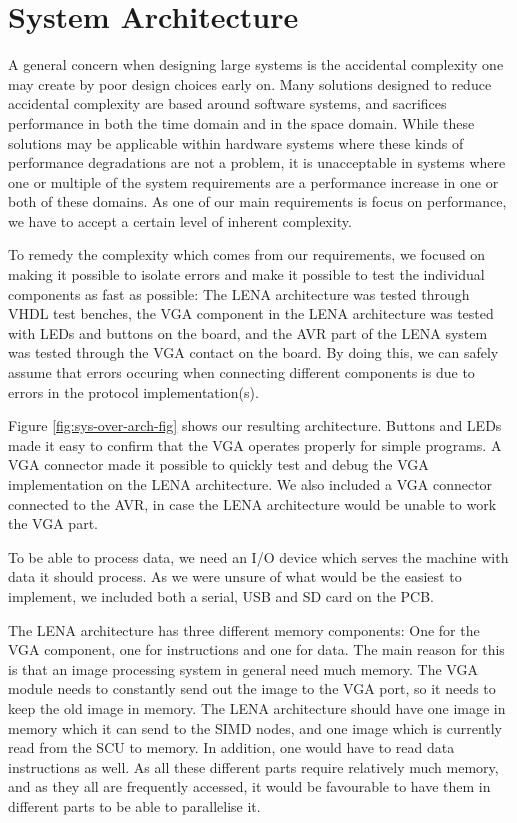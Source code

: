 \section{System Architecture}

A general concern when designing large systems is the accidental
complexity\cite[p.~8-9]{holt2004uml} one may create by poor design choices early
on. Many solutions designed to reduce accidental complexity are based around
software systems, and sacrifices performance in both the time domain and in the
space domain\cite{moseley2006out}. While these solutions may be applicable
within hardware systems where these kinds of performance degradations are not a
problem, it is unacceptable in systems where one or multiple of the system
requirements are a performance increase in one or both of these domains. As one
of our main requirements is focus on performance, we have to accept a certain
level of inherent complexity.



To remedy the complexity which comes from our requirements, we focused on making
it possible to isolate errors and make it possible to test the individual
components as fast as possible: The LENA architecture was tested through VHDL
test benches, the VGA component in the LENA architecture was tested with LEDs
and buttons on the board, and the AVR part of the LENA system was tested through
the VGA contact on the board. By doing this, we can safely assume that errors
occuring when connecting different components is due to errors in the protocol
implementation(s).

Figure \ref{fig:sys-over-arch-fig} shows our resulting architecture. Buttons and
LEDs made it easy to confirm that the VGA operates properly for simple
programs. A VGA connector made it possible to quickly test and debug the VGA
implementation on the LENA architecture. We also included a VGA connector
connected to the AVR, in case the LENA architecture would be unable to work the
VGA part.

To be able to process data, we need an I/O device which serves the machine with
data it should process. As we were unsure of what would be the easiest to
implement, we included both a serial, USB and SD card on the PCB.

The LENA architecture has three different memory components: One for the VGA
component, one for instructions and one for data. The main reason for this is
that an image processing system in general need much memory. The VGA module
needs to constantly send out the image to the VGA port, so it needs to keep the
old image in memory. The LENA architecture should have one image in memory which
it can send to the SIMD nodes, and one image which is currently read from the
SCU to memory. In addition, one would have to read data instructions as well. As
all these different parts require relatively much memory, and as they all are
frequently accessed, it would be favourable to have them in different parts to
be able to parallelise it.
